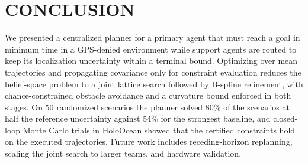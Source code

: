 \documentclass[letterpaper, 10 pt, conference]{ieeeconf}
\theoremstyle{remark}
\begin{document}
\section{CONCLUSION}
We presented a centralized planner for a primary agent that must reach a
goal in minimum time in a GPS-denied environment while support agents are
routed to keep its localization uncertainty within a terminal bound.
Optimizing over mean trajectories and propagating covariance only for
constraint evaluation reduces the belief-space problem to a joint lattice
search followed by B-spline refinement, with chance-constrained obstacle
avoidance and a curvature bound enforced in both stages. On 50 randomized
scenarios the planner solved 80\% of the scenarios at half the reference
uncertainty against 54\% for the strongest baseline, and closed-loop Monte
Carlo trials in HoloOcean showed that the certified constraints hold on the
executed trajectories. Future work includes receding-horizon replanning,
scaling the joint search to larger teams, and hardware validation.



\end{document}
